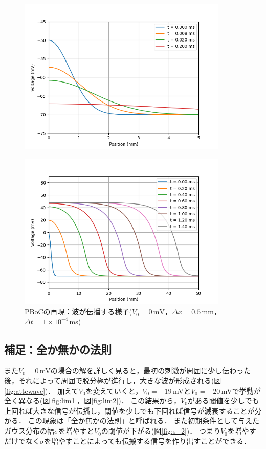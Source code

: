 \documentclass[a4paper,11pt]{jsarticle}
\begin{document}
\begin{figure}[htbp]
  \centering
  \includegraphics[width=10cm]{attenuation.png}
  \caption{}
  \label{fig:atte}
\end{figure}

\begin{figure}[htbp]
  \centering
  \includegraphics[width=10cm]{wave.png}
  \caption{PBoCの再現：波が伝播する様子($V_0=0\,\mathrm{mV}$，$\Delta x=0.5$\,mm，$\Delta t = 1\times 10^{-4}$\,ms)}
  \label{fig:wave}
\end{figure}

\subsection{補足：全か無かの法則}
また$V_0=0$\,mVの場合の解を詳しく見ると，最初の刺激が周囲に少し伝わった後，それによって周囲で脱分極が進行し，大きな波が形成される(図\ref{fig:attewave})．
加えて$V_0$を変えていくと，$V_0=-19$\,mVと$V_0=-20$\,mVで挙動が全く異なる(図\ref{fig:lim1}，図\ref{fig:lim2})．
この結果から，$V_0$がある閾値を少しでも上回れば大きな信号が伝播し，閾値を少しでも下回れば信号が減衰することが分かる．
この現象は「全か無かの法則」と呼ばれる．
また初期条件として与えたガウス分布の幅$\sigma$を増やすと$V_0$の閾値が下がる(図\ref{fig:s_2})．
つまり$V_0$を増やすだけでなく$\sigma$を増やすことによっても伝搬する信号を作り出すことができる．
\end{document}
